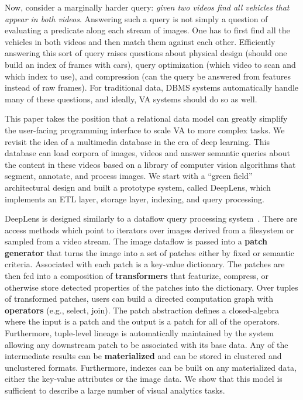 Now, consider a marginally harder query: \emph{given two videos find all vehicles that appear in both videos}.
Answering such a query is not simply a question of evaluating a predicate along each stream of images.
One has to first find all the vehicles in both videos and then match them against each other.
Efficiently answering this sort of query raises questions about physical design (should one build an index of frames with cars), query optimization (which video to scan and which index to use), and compression (can the query be answered from features instead of raw frames).
For traditional data, DBMS systems automatically handle many of these questions, and ideally, VA systems should do so as well.

This paper takes the position that a relational data model can greatly simplify the user-facing programming interface to scale VA to more complex tasks.
We revisit the idea of a multimedia database in the era of deep learning. 
This database can load corpora of images, videos and answer semantic queries about the content in these videos based on a library of computer vision algorithms that segment, annotate, and process images.
We start with a ``green field'' architectural design and built a prototype system, called \textsf{DeepLens}, which implements an ETL layer, storage layer, indexing, and query processing.



\textsf{DeepLens} is designed similarly to a dataflow query processing system~\cite{graefe1994volcano}. There are access methods which point to iterators over images derived from a filesystem or sampled from a video stream. The image dataflow is passed into a  \textbf{patch generator} that turns the image into a set of patches either by fixed or semantic criteria. Associated with each patch is a key-value dictionary.  The patches are then fed into a composition of \textbf{transformers} that featurize, compress, or otherwise store detected properties of the patches into the dictionary. Over tuples of transformed patches, users can build a directed computation graph with \textbf{operators} (e.g., select, join).
The patch abstraction defines a closed-algebra where the input is a patch and the output is a patch for all of the operators.
Furthermore, tuple-level lineage is automatically maintained by the system allowing any downstream patch to be associated with its base data.
Any of the intermediate results can be \textbf{materialized} and can be stored in clustered and unclustered formats. 
Furthermore, indexes can be built on any materialized data, either the key-value attributes or the image data.
We show that this model is sufficient to describe a large number of visual analytics tasks.


